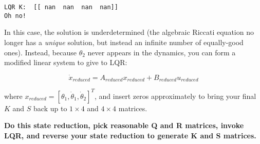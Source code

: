 \documentclass[11pt]{article}
\begin{document}
    \begin{Verbatim}[commandchars=\\\{\}]
LQR K:  [[ nan  nan  nan  nan]]
Oh no!

    \end{Verbatim}

    In this case, the solution is underdetermined (the algebraic Riccati
equation no longer has a \emph{unique} solution, but instead an infinite
number of equally-good ones). Instead, because \(\theta_2\) never
appears in the dynamics, you can form a modified linear system to give
to LQR:

\[\dot{x}_{reduced} = A_{reduced}x_{reduced} + B_{reduced}u_{reduced}\]

where
\(x_{reduced} = \left[\theta_1, \dot \theta_1, \dot \theta_2 \right]^T\),
and insert zeros approximately to bring your final \(K\) and \(S\) back
up to \(1 \times 4\) and \(4 \times 4\) matrices.

\textbf{Do this state reduction, pick reasonable Q and R matrices,
invoke LQR, and reverse your state reduction to generate K and S
matrices.}
\end{document}
